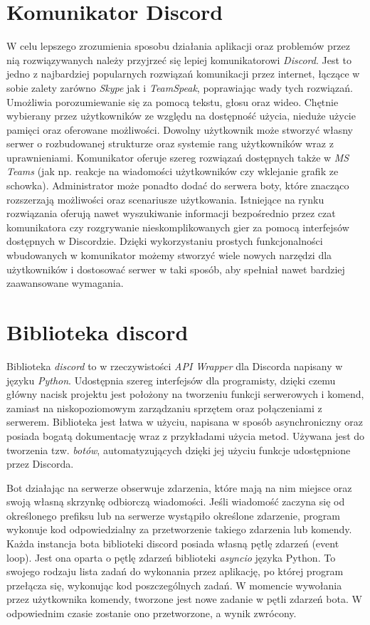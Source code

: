\documentclass[shortabstract,inz]{iithesis}
\begin{document}
		\section{Komunikator Discord}
			W celu lepszego zrozumienia sposobu działania aplikacji oraz problemów przez nią rozwiązywanych należy przyjrzeć się lepiej komunikatorowi \textit{Discord}. Jest to jedno z najbardziej popularnych rozwiązań komunikacji przez internet, łączące w sobie zalety zarówno \textit{Skype}\cite{skype} jak i \textit{TeamSpeak}\cite{teamspeak}, poprawiając wady tych rozwiązań. Umożliwia porozumiewanie się za pomocą tekstu, głosu oraz wideo. Chętnie wybierany przez użytkowników ze względu na dostępność użycia, nieduże użycie pamięci oraz oferowane możliwości. Dowolny użytkownik może stworzyć własny serwer o rozbudowanej strukturze oraz systemie rang użytkowników wraz z uprawnieniami. Komunikator oferuje szereg rozwiązań dostępnych także w \textit{MS Teams}\cite{msteams} (jak np. reakcje na wiadomości użytkowników czy wklejanie grafik ze schowka). Administrator może ponadto dodać do serwera boty, które znacząco rozszerzają możliwości oraz scenariusze użytkowania. Istniejące na rynku rozwiązania oferują nawet wyszukiwanie informacji bezpośrednio przez czat komunikatora czy rozgrywanie nieskomplikowanych gier za pomocą interfejsów dostępnych w Discordzie. Dzięki wykorzystaniu prostych funkcjonalności wbudowanych w komunikator możemy stworzyć wiele nowych narzędzi dla użytkowników i dostosować serwer w taki sposób, aby spełniał nawet bardziej zaawansowane wymagania.
		
		\section{Biblioteka discord}
			Biblioteka \textit{discord} to w rzeczywistości \textit{API Wrapper} dla Discorda napisany w języku \textit{Python}. Udostępnia szereg interfejsów dla programisty, dzięki czemu główny nacisk projektu jest położony na tworzeniu funkcji serwerowych i komend, zamiast na niskopoziomowym zarządzaniu sprzętem oraz połączeniami z serwerem. Biblioteka jest łatwa w użyciu, napisana w sposób asynchroniczny oraz posiada bogatą dokumentację\cite{discordpydocs} wraz z przykładami użycia metod\cite{discordpyexamples}. Używana jest do tworzenia tzw. \textit{botów}\cite{wikibot}, automatyzujących dzięki jej użyciu funkcje udostępnione przez Discorda. 

			Bot działając na serwerze obserwuje zdarzenia, które mają na nim miejsce oraz swoją własną skrzynkę odbiorczą wiadomości. Jeśli wiadomość zaczyna się od określonego prefiksu lub na serwerze wystąpiło określone zdarzenie, program wykonuje kod odpowiedzialny za przetworzenie takiego zdarzenia lub komendy. 
			Każda instancja bota biblioteki discord posiada własną pętlę zdarzeń (event loop). Jest ona oparta o pętlę zdarzeń biblioteki \textit{asyncio} języka Python. To swojego rodzaju lista zadań do wykonania przez aplikację, po której program przełącza się, wykonując kod poszczególnych zadań. W momencie wywołania przez użytkownika komendy, tworzone jest nowe zadanie w pętli zdarzeń bota. W odpowiednim czasie zostanie ono przetworzone, a wynik zwrócony.
			
\end{document}

